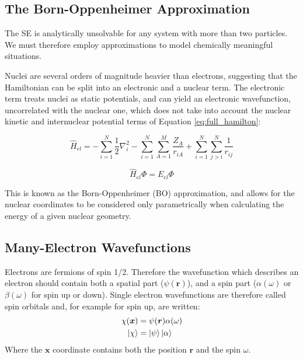 \subsection{The Born-Oppenheimer Approximation}

The SE is analytically unsolvable for any system with more than two particles. We must therefore employ approximations to model chemically meaningful situations.

Nuclei are several orders of magnitude heavier than electrons, suggesting that the Hamiltonian can be split into an electronic and a nuclear term. The electronic term treats nuclei as static potentials, and can yield an electronic wavefunction, uncorrelated with the nuclear one, which does not take into account the nuclear kinetic and internuclear potential terms of Equation \ref{eq:full_hamilton}:

\begin{equation}
    \hat{H}_{el} = - \sum_{i=1}^N \frac{1}{2} \nabla^2_i
              - \sum_{i=1}^N \sum_{A=1}^M \frac{Z_A}{r_{iA}}
              + \sum_{i=1}^N \sum_{j>i}^N \frac{1}{r_{ij}}
    \label{eq:el_ham}
\end{equation}

\begin{equation}
    \hat{H}_{el} \Phi = E_{el} \Phi
    \label{eq:el_tise}
\end{equation}

This is known as the Born-Oppenheimer (BO) approximation, and allows for the nuclear coordinates to be considered only parametrically when calculating the energy of a given nuclear geometry.\cite{Born1927}

\subsection{Many-Electron Wavefunctions}

Electrons are fermions of spin 1/2. Therefore the wavefunction which describes an electron should contain both a spatial part ($\psi(\bm{r})$), and a spin part ($\alpha(\omega)$ or $\beta(\omega)$ for spin up or down). Single electron wavefunctions are therefore called spin orbitals and, for example for spin up, are written:
\begin{equation}
\begin{split}
    \chi(\bm{x}) &= \psi(\bm{r})\alpha(\omega)\\
    \ket{\chi} &= \ket{\psi}\ket{\alpha}
    \label{eq:spinorb}
\end{split}
\end{equation}
Where the $\bm{x}$ coordinate contains both the position $\bm{r}$ and the spin $\omega$.


